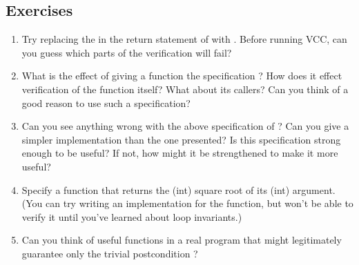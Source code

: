\subsection*{Exercises}
\begin{enumerate}
\item
Try replacing the \vcc{<} in the return statement of  with
\vcc{>}. Before running VCC, can you guess which parts of the
verification will fail?

\item
What is the effect of giving a function the specification
 ? How does it effect verification of
the function itself? What about its callers? Can you think of a good 
reason to use such a specification?


\item
Can you see anything wrong with the above specification of ?
Can you give a simpler implementation than the one presented? Is this 
specification strong enough to be useful? If not, how might it be
strengthened to make it more useful?

\item
Specify a function that returns the (int) square root of its (int)
argument. (You can try writing an implementation for the function, but
won't be able to verify it until you've learned about loop
invariants.)

\item
Can you think of useful functions in a real program that might
legitimately guarantee only the trivial postcondition ?
\end{enumerate}

